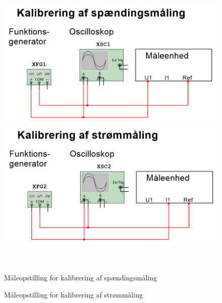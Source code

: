 \begin{figure}[H]
	\centering
	\begin{minipage}[b]{0.48\textwidth}
		\centering
		\includegraphics[width=1.00\textwidth]{Figure/MEkalibreringU} %
	\end{minipage}
	\hfill
	\begin{minipage}[b]{0.48\textwidth}
		\centering
		\includegraphics[width=1.00\textwidth]{Figure/MEkalibreringI} %
	\end{minipage}
	\\ %
	\begin{minipage}[t]{0.48\textwidth}
		\caption{Måleopstilling for kalibrering af spændingsmåling} %
		\label{fig:MEkalibreringU}
	\end{minipage}
	\hfill
	\begin{minipage}[t]{0.48\textwidth}
		\caption{Måleopstilling for kalibrering af strømmåling} %
		\label{fig:MEkalibreringI}
	\end{minipage}
\end{figure}

